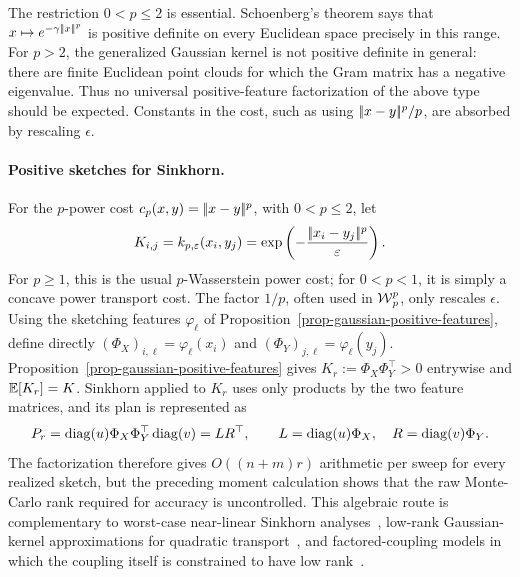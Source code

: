 \begin{rem}
The restriction \(0<p\leq2\) is essential. Schoenberg's theorem says that \(x\mapsto e^{-\gamma|\!| x |\!|^p}\) is positive definite on every Euclidean space precisely in this range. For \(p>2\), the generalized Gaussian kernel is not positive definite in general: there are finite Euclidean point clouds for which the Gram matrix has a negative eigenvalue. Thus no universal positive-feature factorization of the above type should be expected. Constants in the cost, such as using \(|\!| x-y |\!|^p/p\), are absorbed by rescaling \(\epsilon\).
\end{rem}


\paragraph{Positive sketches for Sinkhorn.}
For the \(p\)-power cost \(c_p(x,y)=|\!| x-y |\!|^p\), with \(0<p\leq2\), let
\[
	K_{i,j}=k_{p,\varepsilon}(x_i,y_j)
	=\exp\left( -\frac{|\!| x_i-y_j |\!|^p}{\varepsilon} \right).
\]
For \(p\geq1\), this is the usual \(p\)-Wasserstein power cost; for \(0<p<1\), it is simply a concave power transport cost. The factor \(1/p\), often used in \(\operatorname{\mathcal{W}}_p^p\), only rescales \(\epsilon\). Using the sketching features \(\varphi_\ell\) of Proposition~\ref{prop-gaussian-positive-features}, define directly \((\Phi_X)_{i,\ell}=\varphi_\ell(x_i)\) and \((\Phi_Y)_{j,\ell}=\varphi_\ell(y_j)\).
Proposition~\ref{prop-gaussian-positive-features} gives \(K_r:=\Phi_X\Phi_Y^\top>0\) entrywise and \(\mathbb{E}[K_r]=K\). Sinkhorn applied to \(K_r\) uses only products by the two feature matrices, and its plan is represented as
\[
	P_r
	=
	\operatorname{diag}(u)\Phi_X\Phi_Y^\top\operatorname{diag}(v)
	=
	LR^\top,
	\qquad
	L=\operatorname{diag}(u)\Phi_X,
	\quad
	R=\operatorname{diag}(v)\Phi_Y.
\]
The factorization therefore gives $O((n+m)r)$ arithmetic per sweep for every realized sketch, but the preceding moment calculation shows that the raw Monte-Carlo rank required for accuracy is uncontrolled. This algebraic route is complementary to worst-case near-linear Sinkhorn analyses~\cite{altschuler2017near}, low-rank Gaussian-kernel approximations for quadratic transport~\cite{AltschulerBachRudiWeed2018QuadraticTransport}, and factored-coupling models in which the coupling itself is constrained to have low rank~\cite{scetbon2021lowrank}.

